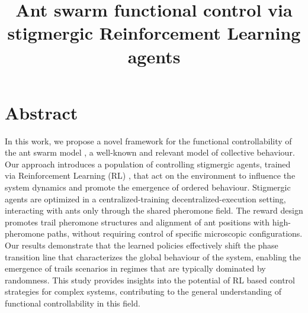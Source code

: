 \documentclass[pdflatex,sn-mathphys-num]{sn-jnl}%
\theoremstyle{thmstyleone}%
\theoremstyle{thmstyletwo}%
\theoremstyle{thmstylethree}%
\begin{document}
\title{Ant swarm functional control via stigmergic Reinforcement Learning agents}

\author[1,3]{ }

\author[1]{ }

\author*[2]{ }

\author[2]{ }

\author[1]{ }




\maketitle

\section*{Abstract}
In this work, we propose a novel framework for the functional controllability of the ant swarm model \cite{chialvoswarms,patternformation,SwarmPhaseTrans}, a well-known and relevant model of collective behaviour. Our approach introduces a population of controlling stigmergic agents, trained via Reinforcement Learning (RL) \cite{suttonbarto}, that act on the environment to influence the system dynamics and promote the emergence of ordered behaviour. Stigmergic agents are optimized %
in a centralized-training decentralized-execution setting, interacting with ants only through the shared pheromone field. The reward design promotes trail pheromone structures and alignment of ant positions with high-pheromone paths, without requiring control of specific microscopic configurations. Our results demonstrate that the learned policies effectively shift the phase transition line that characterizes the global behaviour of the system, enabling the emergence of trails scenarios in regimes that are typically dominated by randomness. This study provides insights into the potential of RL based control strategies for complex systems, contributing %
to the general understanding of functional controllability in this field. %
\end{document}
